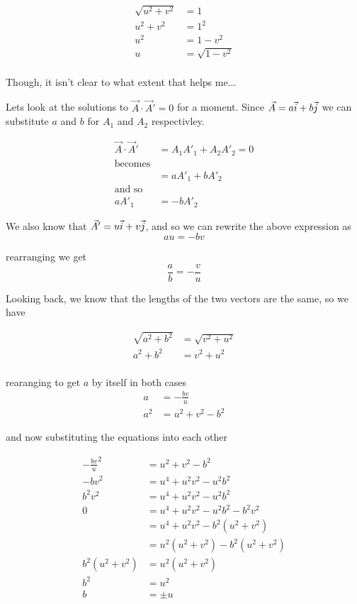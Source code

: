 \begin{align*}
\sqrt{u^2 + v^2} &= 1\\
u^2 + v^2 &= 1^2\\
u^2 &= 1 - v^2\\
u &= \sqrt{1 - v^2}\\
\end{align*}

Though, it isn't clear to what extent that helps me...

Lets look at the solutions to $\vec{A} \cdot \vec{A}' = 0$ for a 
moment. Since $\vec{A} = a\vec{i} + b\vec{j}$ we can substitute $a$ and $b$ 
for $A_1$ and $A_2$ respectivley.

\begin{align*}
\vec{A} \cdot \vec{A}' &= {A_1}{A'}_1 + {A_2}{A'}_2 = 0\\
\text{becomes}\\
&= a{A'}_1 + b{A'}_2\\
\text{and so}\\
a{A'}_1 &= - b{A'}_2
\end{align*}

We also know that $\vec{A}' = u\vec{i} + v\vec{j}$, and so we can rewrite 
the above expression as
\begin{equation*}
au = - bv
\end{equation*}

rearranging we get
\begin{equation*}
\frac{a}{b} = - \frac{v}{u}
\end{equation*}

Looking back, we know that the lengths of the two vectors are the 
same, so we have

\begin{align*}
\sqrt{a^2 + b^2} &= \sqrt{v^2 + u^2}\\
a^2 + b^2 &= v^2 + u^2\\
\end{align*}


rearanging to get $a$ by itself in both cases
\begin{align*}
a &= -\frac{bv}{u}\\
a^2 &= u^2 + v^2 - b^2
\end{align*}

and now substituting the equations into each other

\begin{align*}
{-\frac{bv}{u}}^2 &= u^2 + v^2 -b^2\\
-{bv}^2 &= u^4 + u^2v^2 -u^2b^2\\
b^2v^2 &= u^4 + u^2v^2 -u^2b^2\\
0 &= u^4 + u^2v^2 -u^2b^2 - b^2v^2\\
&= u^4 + u^2v^2 - b^2(u^2 + v^2)\\
&= u^2(u^2 + v^2) - b^2(u^2 + v^2)\\
b^2(u^2 + v^2) &= u^2(u^2 + v^2) \\
b^2 &= u^2 \\
b &= \pm u
\end{align*}


